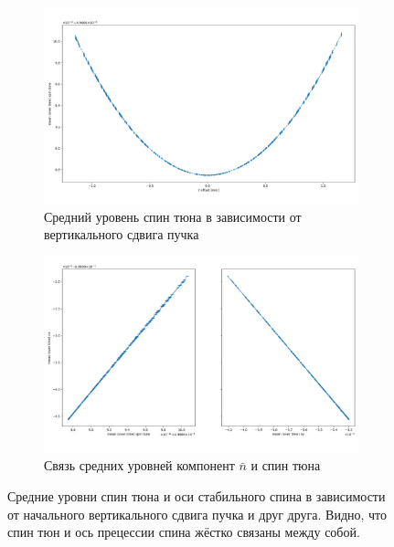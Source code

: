 \documentclass{report}
\begin{document}
\begin{figure}[H]
	\centering
	\begin{subfigure}[b]{\textwidth}
		\includegraphics[width=\linewidth]{edm_img/mean_spin_tune_vs_y_offset}
		\caption{Средний уровень спин тюна в зависимости от вертикального сдвига пучка}
	\end{subfigure}

	\begin{subfigure}[b]{\textwidth}
		\includegraphics[width=\linewidth]{edm_img/mean_n_bar_vs_spin_tune}
		\caption{Связь средних уровней компонент $\bar n$ и спин тюна}
	\end{subfigure}
	\caption{Средние уровни спин тюна и оси стабильного спина в зависимости от начального вертикального сдвига пучка и друг друга. Видно, что спин тюн и ось прецессии спина жёстко связаны между собой.\label{fig:mean_tune_axis}}
\end{figure}
\end{document}
